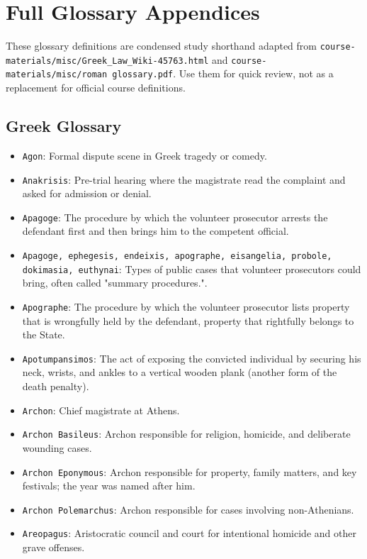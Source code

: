 \documentclass[11pt]{article}
\begin{document}
\section{Full Glossary Appendices}

These glossary definitions are condensed study shorthand adapted from \texttt{course-materials/misc/Greek\_Law\_Wiki-45763.html} and \texttt{course-materials/misc/roman glossary.pdf}. Use them for quick review, not as a replacement for official course definitions.

\subsection{Greek Glossary}

\begin{itemize}
\item \texttt{Agon}: Formal dispute scene in Greek tragedy or comedy.
\item \texttt{Anakrisis}: Pre-trial hearing where the magistrate read the complaint and asked for admission or denial.
\item \texttt{Apagoge}: The procedure by which the volunteer prosecutor arrests the defendant first and then brings him to the competent official.
\item \texttt{Apagoge, ephegesis, endeixis, apographe, eisangelia, probole, dokimasia, euthynai}: Types of public cases that volunteer prosecutors could bring, often called "summary procedures.".
\item \texttt{Apographe}: The procedure by which the volunteer prosecutor lists property that is wrongfully held by the defendant, property that rightfully belongs to the State.
\item \texttt{Apotumpansimos}: The act of exposing the convicted individual by securing his neck, wrists, and ankles to a vertical wooden plank (another form of the death penalty).
\item \texttt{Archon}: Chief magistrate at Athens.
\item \texttt{Archon Basileus}: Archon responsible for religion, homicide, and deliberate wounding cases.
\item \texttt{Archon Eponymous}: Archon responsible for property, family matters, and key festivals; the year was named after him.
\item \texttt{Archon Polemarchus}: Archon responsible for cases involving non-Athenians.
\item \texttt{Areopagus}: Aristocratic council and court for intentional homicide and other grave offenses.

\end{itemize}
\end{document}
